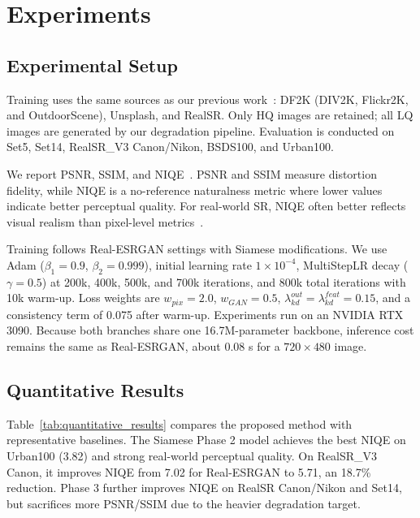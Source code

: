\documentclass[runningheads]{llncs}
\begin{document}
\section{Experiments}

\subsection{Experimental Setup}

Training uses the same sources as our previous work~\cite{11309534}: DF2K (DIV2K, Flickr2K, and OutdoorScene), Unsplash, and RealSR. Only HQ images are retained; all LQ images are generated by our degradation pipeline. Evaluation is conducted on Set5, Set14, RealSR\_V3 Canon/Nikon, BSDS100, and Urban100.

We report PSNR, SSIM, and NIQE~\cite{mittal2012making}. PSNR and SSIM measure distortion fidelity, while NIQE is a no-reference naturalness metric where lower values indicate better perceptual quality. For real-world SR, NIQE often better reflects visual realism than pixel-level metrics~\cite{wang2021realesrgan}.

Training follows Real-ESRGAN settings with Siamese modifications. We use Adam ($\beta_1=0.9$, $\beta_2=0.999$), initial learning rate $1\times10^{-4}$, MultiStepLR decay ($\gamma=0.5$) at 200k, 400k, 500k, and 700k iterations, and 800k total iterations with 10k warm-up. Loss weights are $w_{pix}=2.0$, $w_{GAN}=0.5$, $\lambda^{out}_{kd}=\lambda^{feat}_{kd}=0.15$, and a consistency term of 0.075 after warm-up. Experiments run on an NVIDIA RTX 3090. Because both branches share one 16.7M-parameter backbone, inference cost remains the same as Real-ESRGAN, about 0.08 s for a $720\times480$ image.

\subsection{Quantitative Results}

Table~\ref{tab:quantitative_results} compares the proposed method with representative baselines. The Siamese Phase 2 model achieves the best NIQE on Urban100 (3.82) and strong real-world perceptual quality. On RealSR\_V3 Canon, it improves NIQE from 7.02 for Real-ESRGAN to 5.71, an 18.7\% reduction. Phase 3 further improves NIQE on RealSR Canon/Nikon and Set14, but sacrifices more PSNR/SSIM due to the heavier degradation target.
\end{document}
